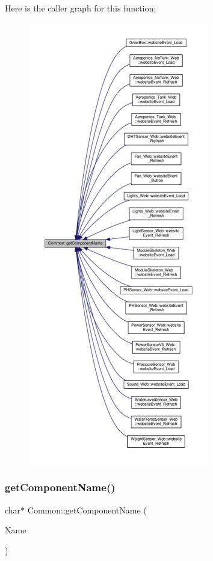 Here is the caller graph for this function\+:
\nopagebreak
\begin{figure}[H]
\begin{center}
\leavevmode
\includegraphics[height=550pt]{class_common_a86553d0d8ffabfd97236aa54ca2ba8f1_icgraph}
\end{center}
\end{figure}
\mbox{\label{class_common_a096e52124ab651d6e9b6fab9f13e11a8}} 
\subsubsection{\texorpdfstring{get\+Component\+Name()}{getComponentName()}\hspace{0.1cm}{\footnotesize\ttfamily [2/2]}}
{\footnotesize\ttfamily char$\ast$ Common\+::get\+Component\+Name (\begin{DoxyParamCaption}\item[{const \+\_\+\+\_\+\+Flash\+String\+Helper $\ast$}]{Name }\end{DoxyParamCaption})}

